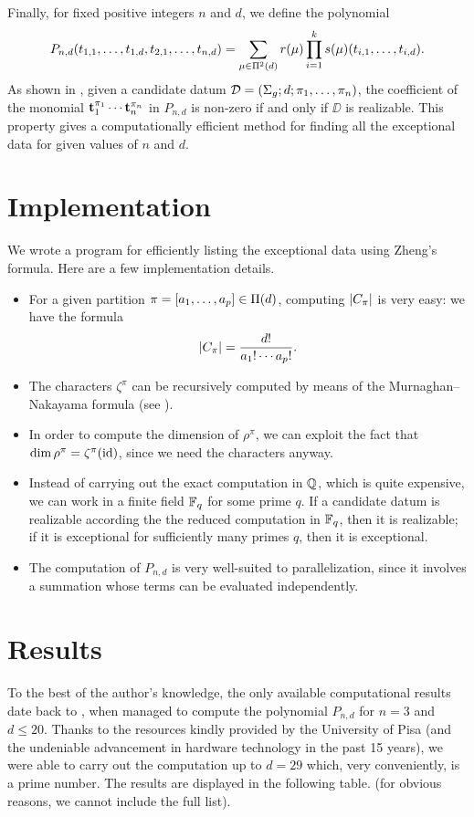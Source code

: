 Finally, for fixed positive integers $n$ and $d$, we define the polynomial
\[
P_{n,d}(t_{1,1},\ldots,t_{1,d},t_{2,1},\ldots,t_{n,d})=\sum_{\mu\in\SPartitions{d}}r(\mu)\prod_{i=1}^ks(\mu)(t_{i,1},\ldots,t_{i,d}).
\]
As shown in \cite{zheng}, given a candidate datum $\DD=\datum{\surf{g}}{d}{\pi_1,\ldots,\pi_n}$, the coefficient of the monomial $\tt_1^{\pi_1}\cdots\tt_n^{\pi_n}$ in $P_{n,d}$ is non-zero if and only if $\DD$ is realizable. This property gives a computationally efficient method for finding all the exceptional data for given values of $n$ and $d$.

\section{Implementation}\label{computational-results:sc:implementation}
We wrote a \Cpp{} program for efficiently listing the exceptional data using Zheng's formula. Here are a few implementation details.
\begin{itemize}
\item For a given partition $\pi=[a_1,\ldots,a_p]\in\Partitions{d}$, computing $\card{C_\pi}$ is very easy: we have the formula
\[
\card{C_\pi}=\frac{d!}{a_1!\cdots a_p!}.
\]
\item The characters $\zeta^\pi$ can be recursively computed by means of the Murnaghan–Nakayama formula (see ).
\item In order to compute the dimension of $\rho^\pi$, we can exploit the fact that $\dim\rho^\pi=\zeta^\pi(\id)$, since we need the characters anyway.
\item Instead of carrying out the exact computation in $\QQ$, which is quite expensive, we can work in a finite field $\FF_q$ for some prime $q$. If a candidate datum is realizable according the the reduced computation in $\FF_q$, then it is realizable; if it is exceptional for sufficiently many primes $q$, then it is exceptional.
\item The computation of $P_{n,d}$ is very well-suited to parallelization, since it involves a summation whose terms can be evaluated independently.
\end{itemize}

\section{Results}

To the best of the author's knowledge, the only available computational results date back to \citeyear{zheng}, when \citeauthor{zheng} managed to compute the polynomial $P_{n,d}$ for $n=3$ and $d\le 20$. Thanks to the resources kindly provided by the University of Pisa (and the undeniable advancement in hardware technology in the past 15 years), we were able to carry out the computation up to $d=29$ which, very conveniently, is a prime number. The results are displayed in the following table. (for obvious reasons, we cannot include the full list).

